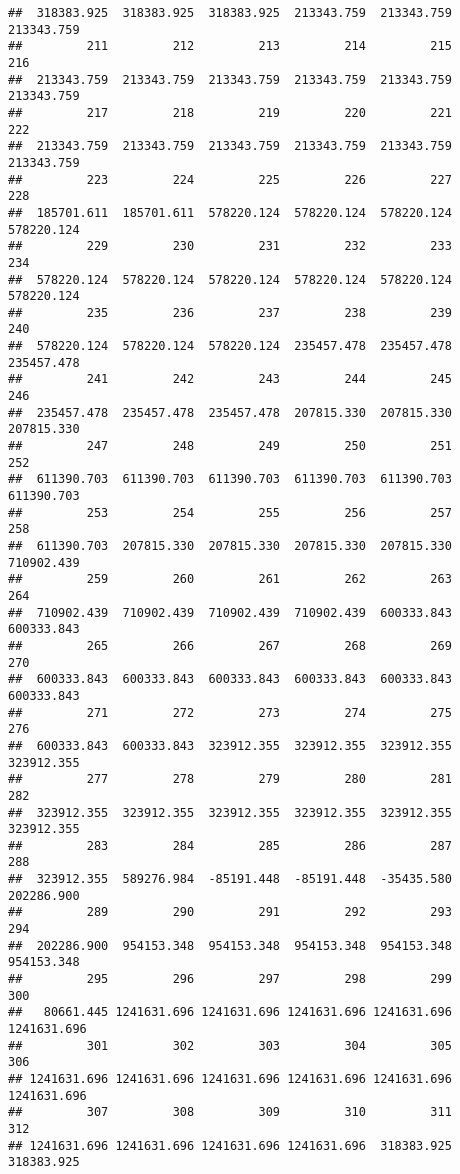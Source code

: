 \documentclass[
]{book}
\begin{document}
\begin{verbatim}
##  318383.925  318383.925  318383.925  213343.759  213343.759  213343.759 
##         211         212         213         214         215         216 
##  213343.759  213343.759  213343.759  213343.759  213343.759  213343.759 
##         217         218         219         220         221         222 
##  213343.759  213343.759  213343.759  213343.759  213343.759  213343.759 
##         223         224         225         226         227         228 
##  185701.611  185701.611  578220.124  578220.124  578220.124  578220.124 
##         229         230         231         232         233         234 
##  578220.124  578220.124  578220.124  578220.124  578220.124  578220.124 
##         235         236         237         238         239         240 
##  578220.124  578220.124  578220.124  235457.478  235457.478  235457.478 
##         241         242         243         244         245         246 
##  235457.478  235457.478  235457.478  207815.330  207815.330  207815.330 
##         247         248         249         250         251         252 
##  611390.703  611390.703  611390.703  611390.703  611390.703  611390.703 
##         253         254         255         256         257         258 
##  611390.703  207815.330  207815.330  207815.330  207815.330  710902.439 
##         259         260         261         262         263         264 
##  710902.439  710902.439  710902.439  710902.439  600333.843  600333.843 
##         265         266         267         268         269         270 
##  600333.843  600333.843  600333.843  600333.843  600333.843  600333.843 
##         271         272         273         274         275         276 
##  600333.843  600333.843  323912.355  323912.355  323912.355  323912.355 
##         277         278         279         280         281         282 
##  323912.355  323912.355  323912.355  323912.355  323912.355  323912.355 
##         283         284         285         286         287         288 
##  323912.355  589276.984  -85191.448  -85191.448  -35435.580  202286.900 
##         289         290         291         292         293         294 
##  202286.900  954153.348  954153.348  954153.348  954153.348  954153.348 
##         295         296         297         298         299         300 
##   80661.445 1241631.696 1241631.696 1241631.696 1241631.696 1241631.696 
##         301         302         303         304         305         306 
## 1241631.696 1241631.696 1241631.696 1241631.696 1241631.696 1241631.696 
##         307         308         309         310         311         312 
## 1241631.696 1241631.696 1241631.696 1241631.696  318383.925  318383.925 

\end{verbatim}
\end{document}
